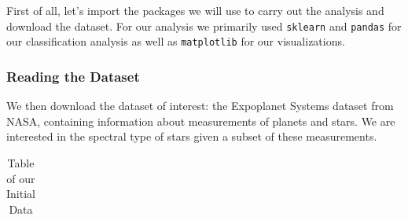 \documentclass[
  letterpaper,
  DIV=11,
  numbers=noendperiod]{scrartcl}
\begin{document}
First of all, let's import the packages we will use to carry out the
analysis and download the dataset. For our analysis we primarily used
\texttt{sklearn} and \texttt{pandas} for our classification analysis as
well as \texttt{matplotlib} for our visualizations.

\subsubsection{Reading the Dataset}\label{reading-the-dataset}

We then download the dataset of interest: the Expoplanet Systems dataset
from NASA, containing information about measurements of planets and
stars. We are interested in the spectral type of stars given a subset of
these measurements.

\begin{longtable}[]{@{}
  >{\raggedright\arraybackslash}p{}
  >{\raggedright\arraybackslash}p{}
  >{\raggedleft\arraybackslash}p{}
  >{\raggedleft\arraybackslash}p{}
  >{\raggedleft\arraybackslash}p{}
  >{\raggedleft\arraybackslash}p{}
  >{\raggedleft\arraybackslash}p{}@{}}

\caption{\label{tbl-read-data}Table of our Initial Data}

\tabularnewline


\end{longtable}
\end{document}
